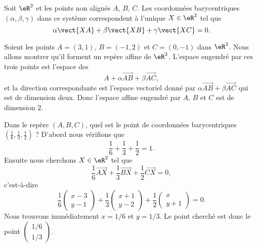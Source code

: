 \begin{normaltext}      \label{NORMooOGHBooMjmouu}
    Soit \( \eR^2\) et les points non alignés \( A\), \( B\), \( C\). Les coordonnées barycentriques \( (\alpha,\beta,\gamma)\) dans ce système correspondent à l'unique \( X\in \eR^2\) tel que
    \begin{equation}
        \alpha \vect{ XA }+\beta\vect{ XB }+\gamma\vect{ XC }=0.
    \end{equation}
\end{normaltext}

\begin{example}
    Soient les points \( A=(3,1)\), \( B=(-1,2)\) et \( C=(0,-1)\) dans \( \eR^2\). Nous allons montrer qu'il forment un repère affine de \( \eR^2\). L'espace engendré par ces trois points est l'espace des
    \begin{equation}
        A+\alpha\overrightarrow{ AB }+\beta\overrightarrow{ AC },
    \end{equation}
    et la direction correspondante est l'espace vectoriel donné par \( \alpha\overrightarrow{ AB }+\beta\overrightarrow{ AC }\) qui est de dimension deux. Donc l'espace affine engendré par \( A\), \( B\) et \( C\) est de dimension \( 2\).
\end{example}

\begin{example}
    Dans le repère \( (A,B,C)\), quel est le point de coordonnées barycentriques \( (\frac{1}{ 6 },\frac{1}{ 3 },\frac{1}{ 2 })\) ? D'abord nous vérifions que
    \begin{equation}
        \frac{1}{ 6 }+\frac{1}{ 3 }+\frac{1}{ 2 }=1.
    \end{equation}
    Ensuite nous cherchons \( X\in \eR^2\) tel que
    \begin{equation}
        \frac{1}{ 6 }\overrightarrow{ AX }+\frac{1}{ 3 }\overrightarrow{ BX }+\frac{1}{ 2 }\overrightarrow{ CX }=0,
    \end{equation}
    c'est-à-dire
    \begin{equation}
        \frac{1}{ 6 }\begin{pmatrix}
            x-3    \\
            y-1
        \end{pmatrix}+\frac{1}{ 3 }\begin{pmatrix}
            x+1    \\
            y-2
        \end{pmatrix}+\frac{1}{ 2 }\begin{pmatrix}
            x    \\
            y+1
        \end{pmatrix}=0.
    \end{equation}
    Nous trouvons immédiatement \( x=1/6\) et \( y=1/3\). Le point cherché est donc le point \( \begin{pmatrix}
        1/6    \\
        1/3
    \end{pmatrix}\).
\end{example}

